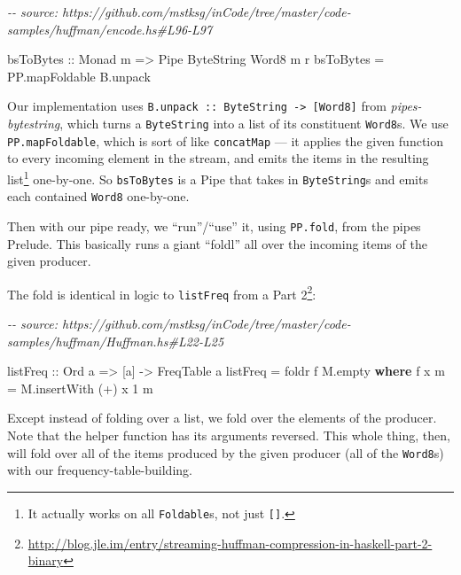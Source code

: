 \documentclass[]{article}
\newenvironment{Shaded}{}{}
\newcommand{\CommentTok}[1]{\textcolor[rgb]{0.38,0.63,0.69}{\textit{#1}}}
\newcommand{\DataTypeTok}[1]{\textcolor[rgb]{0.56,0.13,0.00}{#1}}
\newcommand{\DecValTok}[1]{\textcolor[rgb]{0.25,0.63,0.44}{#1}}
\newcommand{\FunctionTok}[1]{\textcolor[rgb]{0.02,0.16,0.49}{#1}}
\newcommand{\KeywordTok}[1]{\textcolor[rgb]{0.00,0.44,0.13}{\textbf{#1}}}
\newcommand{\NormalTok}[1]{#1}
\newcommand{\OperatorTok}[1]{\textcolor[rgb]{0.40,0.40,0.40}{#1}}
\newcommand{\OtherTok}[1]{\textcolor[rgb]{0.00,0.44,0.13}{#1}}
\renewcommand{\href}[2]{#2\footnote{\url{#1}}}
\begin{document}
\begin{Shaded}
\begin{Highlighting}[]
\CommentTok{{-}{-} source: https://github.com/mstksg/inCode/tree/master/code{-}samples/huffman/encode.hs\#L96{-}L97}

\OtherTok{bsToBytes ::} \DataTypeTok{Monad}\NormalTok{ m }\OtherTok{=\textgreater{}} \DataTypeTok{Pipe} \DataTypeTok{ByteString} \DataTypeTok{Word8}\NormalTok{ m r}
\NormalTok{bsToBytes }\OtherTok{=}\NormalTok{ PP.mapFoldable B.unpack}
\end{Highlighting}
\end{Shaded}

Our implementation uses
\texttt{B.unpack\ ::\ ByteString\ -\textgreater{}\ {[}Word8{]}} from
\emph{pipes-bytestring}, which turns a \texttt{ByteString} into a list of its
constituent \texttt{Word8}s. We use \texttt{PP.mapFoldable}, which is sort of
like \texttt{concatMap} --- it applies the given function to every incoming
element in the stream, and emits the items in the resulting list\footnote{It
  actually works on all \texttt{Foldable}s, not just \texttt{{[}{]}}.}
one-by-one. So \texttt{bsToBytes} is a Pipe that takes in \texttt{ByteString}s
and emits each contained \texttt{Word8} one-by-one.

Then with our pipe ready, we ``run''/``use'' it, using \texttt{PP.fold}, from
the pipes Prelude. This basically runs a giant ``foldl'' all over the incoming
items of the given producer.

The fold is identical in logic to \texttt{listFreq} from a
\href{http://blog.jle.im/entry/streaming-huffman-compression-in-haskell-part-2-binary}{Part
2}:

\begin{Shaded}
\begin{Highlighting}[]
\CommentTok{{-}{-} source: https://github.com/mstksg/inCode/tree/master/code{-}samples/huffman/Huffman.hs\#L22{-}L25}

\OtherTok{listFreq ::} \DataTypeTok{Ord}\NormalTok{ a }\OtherTok{=\textgreater{}}\NormalTok{ [a] }\OtherTok{{-}\textgreater{}} \DataTypeTok{FreqTable}\NormalTok{ a}
\NormalTok{listFreq }\OtherTok{=} \FunctionTok{foldr}\NormalTok{ f M.empty}
  \KeywordTok{where}
\NormalTok{    f x m }\OtherTok{=}\NormalTok{ M.insertWith (}\OperatorTok{+}\NormalTok{) x }\DecValTok{1}\NormalTok{ m}
\end{Highlighting}
\end{Shaded}

Except instead of folding over a list, we fold over the elements of the
producer. Note that the helper function has its arguments reversed. This whole
thing, then, will fold over all of the items produced by the given producer (all
of the \texttt{Word8}s) with our frequency-table-building.
\end{document}
